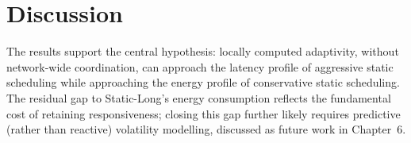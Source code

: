 \section{Discussion}
The results support the central hypothesis: locally computed adaptivity, without network-wide
coordination, can approach the latency profile of aggressive static scheduling while
approaching the energy profile of conservative static scheduling. The residual gap to
Static-Long's energy consumption reflects the fundamental cost of retaining responsiveness;
closing this gap further likely requires predictive (rather than reactive) volatility
modelling, discussed as future work in Chapter~6.

